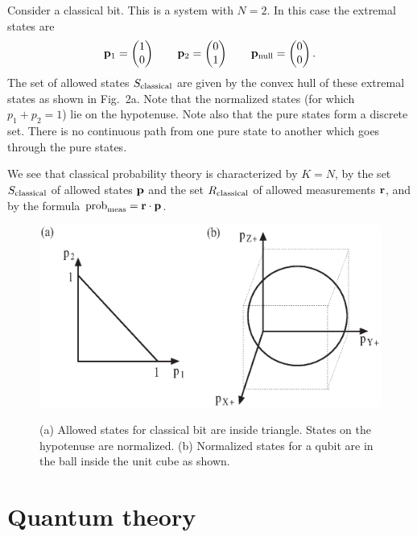 \documentclass[12pt]{article}
\begin{document}
Consider a classical
bit. This is a system with $N=2$.  In this case the extremal states
are
\begin{equation}
{\bf p}_1= \left( \begin{matrix} 1 \\ 0 \end{matrix} \right) \qquad
{\bf p}_2= \left( \begin{matrix} 0 \\ 1 \end{matrix} \right) \qquad
{\bf p}_{\rm null}= \left( \begin{matrix} 0 \\ 0 \end{matrix} \right).
\end{equation}
The set of allowed states $S_{\rm classical}$ are given by the convex
hull of these extremal states as shown
in Fig.~2a. Note that the normalized states (for which $p_1+p_2=1$)
lie on the hypotenuse.  Note also that the pure states form a discrete
set.  There is no continuous path from one pure state to another which
goes through the pure states.

We see that classical probability theory is characterized by $K=N$, by the
set $S_{\rm classical}$ of allowed states ${\bf p}$ and the set
$R_{\rm classical}$ of allowed measurements ${\bf r}$,
and by the formula ${\rm prob}_{\rm meas}={\bf r}\cdot{\bf p}$.
\begin{figure}[t]
\resizebox{\textwidth}{!}
{\includegraphics{crakowf2.eps}}
\caption{\small (a) Allowed states for classical bit are inside triangle.
States on the hypotenuse are normalized.  (b) Normalized states for a
qubit are in the ball inside the unit cube as shown.}
\end{figure}



\section{Quantum theory}\label{quantumtheory}
\end{document}
